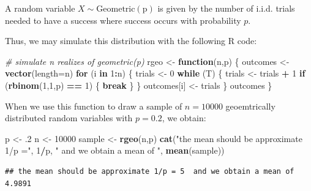 \documentclass[
]{article}
\newenvironment{Shaded}{\begin{snugshade}}{\end{snugshade}}
\newcommand{\AttributeTok}[1]{\textcolor[rgb]{0.13,0.29,0.53}{#1}}
\newcommand{\CommentTok}[1]{\textcolor[rgb]{0.56,0.35,0.01}{\textit{#1}}}
\newcommand{\ControlFlowTok}[1]{\textcolor[rgb]{0.13,0.29,0.53}{\textbf{#1}}}
\newcommand{\DecValTok}[1]{\textcolor[rgb]{0.00,0.00,0.81}{#1}}
\newcommand{\FunctionTok}[1]{\textcolor[rgb]{0.13,0.29,0.53}{\textbf{#1}}}
\newcommand{\NormalTok}[1]{#1}
\newcommand{\OtherTok}[1]{\textcolor[rgb]{0.56,0.35,0.01}{#1}}
\newcommand{\SpecialCharTok}[1]{\textcolor[rgb]{0.81,0.36,0.00}{\textbf{#1}}}
\newcommand{\StringTok}[1]{\textcolor[rgb]{0.31,0.60,0.02}{#1}}
\begin{document}
A random variable \(X \sim \operatorname{Geometric(p)}\) is given by the
number of i.i.d. trials needed to have a success where success occurs
with probability \(p\).

Thus, we may simulate this distribution with the following R code:

\begin{Shaded}
\begin{Highlighting}[]
\CommentTok{\# simulate n realizes of geometric(p)}
\NormalTok{rgeo }\OtherTok{\textless{}{-}} \ControlFlowTok{function}\NormalTok{(n,p)}
\NormalTok{\{}
\NormalTok{  outcomes }\OtherTok{\textless{}{-}} \FunctionTok{vector}\NormalTok{(}\AttributeTok{length=}\NormalTok{n)}
  \ControlFlowTok{for}\NormalTok{ (i }\ControlFlowTok{in} \DecValTok{1}\SpecialCharTok{:}\NormalTok{n)}
\NormalTok{  \{}
\NormalTok{    trials }\OtherTok{\textless{}{-}} \DecValTok{0}
    \ControlFlowTok{while}\NormalTok{ (T)}
\NormalTok{    \{}
\NormalTok{      trials }\OtherTok{\textless{}{-}}\NormalTok{ trials }\SpecialCharTok{+} \DecValTok{1}
      \ControlFlowTok{if}\NormalTok{ (}\FunctionTok{rbinom}\NormalTok{(}\DecValTok{1}\NormalTok{,}\DecValTok{1}\NormalTok{,p) }\SpecialCharTok{==} \DecValTok{1}\NormalTok{)}
\NormalTok{      \{}
        \ControlFlowTok{break}
\NormalTok{      \}}
\NormalTok{    \}}
\NormalTok{    outcomes[i] }\OtherTok{\textless{}{-}}\NormalTok{ trials}
\NormalTok{  \}}
\NormalTok{  outcomes}
\NormalTok{\}}
\end{Highlighting}
\end{Shaded}

When we use this function to draw a sample of \(n=10000\) geoemtrically
distributed random variables with \(p=0.2\), we obtain:

\begin{Shaded}
\begin{Highlighting}[]
\NormalTok{p }\OtherTok{\textless{}{-}}\NormalTok{ .}\DecValTok{2}
\NormalTok{n }\OtherTok{\textless{}{-}} \DecValTok{10000}
\NormalTok{sample }\OtherTok{\textless{}{-}} \FunctionTok{rgeo}\NormalTok{(n,p)}
\FunctionTok{cat}\NormalTok{(}\StringTok{"the mean should be approximate 1/p ="}\NormalTok{, }\DecValTok{1}\SpecialCharTok{/}\NormalTok{p, }\StringTok{" and we obtain a mean of "}\NormalTok{, }\FunctionTok{mean}\NormalTok{(sample))}
\end{Highlighting}
\end{Shaded}

\begin{verbatim}
## the mean should be approximate 1/p = 5  and we obtain a mean of  4.9891
\end{verbatim}
\end{document}
